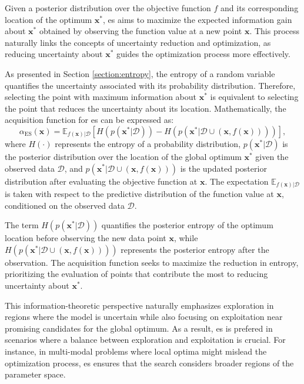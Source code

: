 Given a posterior distribution over the objective function $f$ and its corresponding location of the optimum $\mathbf{x}^*$, \ac{es} aims to maximize the expected information gain about $\mathbf{x}^*$ obtained by observing the function value at a new point $\mathbf{x}$. This process naturally links the concepts of uncertainty reduction and optimization, as reducing uncertainty about $\mathbf{x}^*$ guides the optimization process more effectively.

As presented in Section \ref{section:entropy}, the entropy of a random variable quantifies the uncertainty associated with its probability distribution. Therefore, selecting the point with maximum information about $\mathbf{x}^*$ is equivalent to selecting the point that reduces the uncertainty about its location. Mathematically, the acquisition function for \ac{es} can be expressed as:
\begin{equation}
    \alpha_{\text{ES}}(\mathbf{x}) = \mathbb{E}_{f(\mathbf{x})\vert \mathcal{D}} \left[H(p(\mathbf{x}^* \vert \mathcal{D})) - H(p(\mathbf{x}^* \vert \mathcal{D} \cup (\mathbf{x}, f(\mathbf{x}))))\right],
\end{equation}
where $H(\cdot)$ represents the entropy of a probability distribution, $p(\mathbf{x}^* \vert \mathcal{D})$ is the posterior distribution over the location of the global optimum $\mathbf{x}^*$ given the observed data $\mathcal{D}$, and $p(\mathbf{x}^* \vert \mathcal{D} \cup (\mathbf{x}, f(\mathbf{x})))$ is the updated posterior distribution after evaluating the objective function at $\mathbf{x}$. The expectation $\mathbb{E}_{f(\mathbf{x}) \vert \mathcal{D}}$ is taken with respect to the predictive distribution of the function value at $\mathbf{x}$, conditioned on the observed data $\mathcal{D}$.

The term $H(p(\mathbf{x}^* \vert \mathcal{D}))$ quantifies the posterior entropy of the optimum location before observing the new data point $\mathbf{x}$, while $H(p(\mathbf{x}^* \vert \mathcal{D} \cup (\mathbf{x}, f(\mathbf{x}))))$ represents the posterior entropy after the observation. The acquisition function seeks to maximize the reduction in entropy, prioritizing the evaluation of points that contribute the most to reducing uncertainty about $\mathbf{x}^*$.

This information-theoretic perspective naturally emphasizes exploration in regions where the model is uncertain while also focusing on exploitation near promising candidates for the global optimum. As a result, \ac{es} is prefered in scenarios where a balance between exploration and exploitation is crucial. For instance, in multi-modal problems where local optima might mislead the optimization process, \ac{es} ensures that the search considers broader regions of the parameter space.


